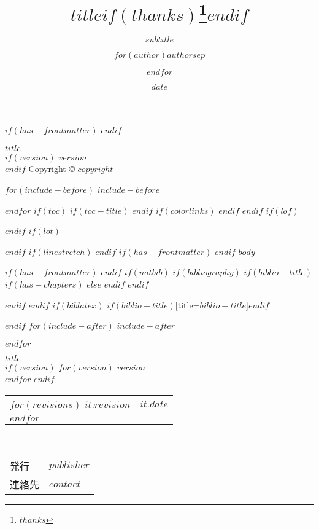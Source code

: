 \documentclass[
$if(fontsize)$
  $fontsize$,
$endif$
$if(papersize)$
  $papersize$paper,
$endif$
$for(classoption)$
  $classoption$$sep$,
$endfor$
]{$documentclass$}
\title{$title$$if(thanks)$\thanks{$thanks$}$endif$}
\subtitle{$subtitle$}
\author{$for(author)$$author$$sep$ \and $endfor$}
\date{$date$}
\begin{document}
$if(has-frontmatter)$
\frontmatter
$endif$

% 
% 
\begin{titlepage}
  \centering
  \vspace*{10cm}
  {\huge \textbf{$title$}}\\[0.5cm]
  $if(version)$
      {\Large \textit{$version$}}\\
  $endif$
  \vfill
  {\small Copyright \copyright{} $copyright$}\\[0.5cm]
\end{titlepage}

\newpage

$for(include-before)$
$include-before$

$endfor$
$if(toc)$
$if(toc-title)$
\renewcommand*\contentsname{$toc-title$}
$endif$
{
$if(colorlinks)$
\hypersetup{linkcolor=$if(toccolor)$$toccolor$$else$$endif$}
$endif$
\setcounter{tocdepth}{$toc-depth$}
\tableofcontents
}
$endif$
$if(lof)$
\listoffigures
$endif$
$if(lot)$
\listoftables
$endif$
$if(linestretch)$
$endif$
$if(has-frontmatter)$
\mainmatter
$endif$
$body$

$if(has-frontmatter)$
\backmatter
$endif$
$if(natbib)$
$if(bibliography)$
$if(biblio-title)$
$if(has-chapters)$
\renewcommand\bibname{$biblio-title$}
$else$
\renewcommand\refname{$biblio-title$}
$endif$
$endif$


$endif$
$endif$
$if(biblatex)$
\printbibliography$if(biblio-title)$[title=$biblio-title$]$endif$

$endif$
$for(include-after)$
$include-after$

$endfor$

% 
% 
\newpage
\begin{titlepage}
  \begin{center}
      \textsf{$title$} \\
      $if(version)$
          $for(version)$
              $version$ \\
          $endfor$
      $endif$
      \vspace*{1cm}
      \begin{tabular}{ll}
          $for(revisions)$
              $it.revision$ & $it.date$ \\
          $endfor$
      \end{tabular} \\
      \begin{tabular}{ll} \toprule
          発行   & $publisher$ \\
          連絡先 & $contact$ \\ \bottomrule
      \end{tabular}
  \end{center}
\end{titlepage}
\end{document}
